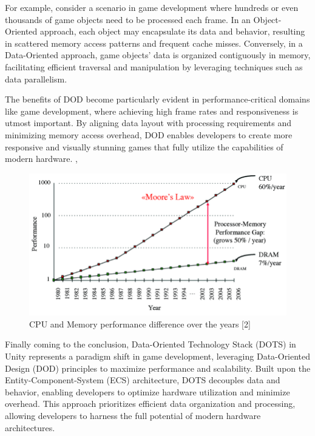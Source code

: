 For example, consider a scenario in game development where hundreds or even thousands of game objects need to be processed each frame. In an Object-Oriented approach, each object may encapsulate its data and behavior, resulting in scattered memory access patterns and frequent cache misses. Conversely, in a Data-Oriented approach, game objects' data is organized contiguously in memory, facilitating efficient traversal and manipulation by leveraging techniques such as data parallelism.

The benefits of DOD become particularly evident in performance-critical domains like game development, where achieving high frame rates and responsiveness is utmost important. By aligning data layout with processing requirements and minimizing memory access overhead, DOD enables developers to create more responsive and visually stunning games that fully utilize the capabilities of modern hardware. \cite{DOD_in_games}, \cite{DOD_applications_in_games}\newline

\begin{figure}[h]
    \centering
    \includegraphics[scale=0.4]{images/CPUvsMEMORY.png}
    \caption{CPU and Memory performance difference over the years [2]}
    \label{fig:cpu-memory}
\end{figure}

Finally coming to the conclusion, Data-Oriented Technology Stack (DOTS) in Unity represents a paradigm shift in game development, leveraging Data-Oriented Design (DOD) principles to maximize performance and scalability. Built upon the Entity-Component-System (ECS) architecture, DOTS decouples data and behavior, enabling developers to optimize hardware utilization and minimize overhead. This approach prioritizes efficient data organization and processing, allowing developers to harness the full potential of modern hardware architectures.

